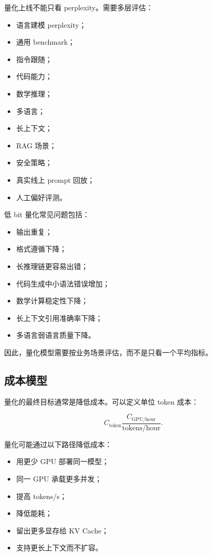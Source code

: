 量化上线不能只看 perplexity。需要多层评估：

\begin{itemize}
\item 语言建模 perplexity；
\item 通用 benchmark；
\item 指令跟随；
\item 代码能力；
\item 数学推理；
\item 多语言；
\item 长上下文；
\item RAG 场景；
\item 安全策略；
\item 真实线上 prompt 回放；
\item 人工偏好评测。
\end{itemize}

低 bit 量化常见问题包括：

\begin{itemize}
\item 输出重复；
\item 格式遵循下降；
\item 长推理链更容易出错；
\item 代码生成中小语法错误增加；
\item 数学计算稳定性下降；
\item 长上下文引用准确率下降；
\item 多语言弱语言质量下降。
\end{itemize}

因此，量化模型需要按业务场景评估，而不是只看一个平均指标。

\subsection{成本模型}
\label{subsec:quantization-cost-model}

量化的最终目标通常是降低成本。可以定义单位 token 成本：

\[
C_{\mathrm{token}}
\frac{C_{\mathrm{GPU/hour}}}
{\mathrm{tokens/hour}}.
\]

量化可能通过以下路径降低成本：

\begin{itemize}
\item 用更少 GPU 部署同一模型；
\item 同一 GPU 承载更多并发；
\item 提高 tokens/s；
\item 降低能耗；
\item 留出更多显存给 KV Cache；
\item 支持更长上下文而不扩容。
\end{itemize}

